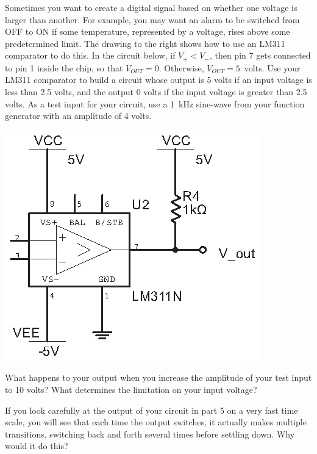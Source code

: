 \begin{enumerate}[wide]
\vspace{0.2in}
\begin{minipage}{.58\textwidth} %

\item Sometimes you want to create a digital signal based on whether one voltage is larger than another.  For example, you may want an alarm to be switched from OFF to ON if some temperature, represented by a voltage, rises above some predetermined limit. The drawing to the right shows how to use an LM311 comparator to do this.  In the circuit below, if $V_+<V_-$, then pin 7 gets connected to pin 1 inside the chip, so that $V_{OUT}=0$.  Otherwise, $V_{OUT}=5$~volts.  Use your LM311 comparator to build a circuit whose output is 5 volts if an input voltage is less than 2.5 volts, and the output 0 volts if the input voltage is greater than 2.5 volts.  As a test input for your circuit, use a 1~kHz sine-wave from your function generator with an amplitude of 4 volts.
\end{minipage}
\begin{minipage}{.39\textwidth}

\hspace{0.25in}\includegraphics{digital_electronics/basic_lm311.eps}
\end{minipage}

\pagebreak

\item What happens to your output when you increase the amplitude of your test input to 10 volts?  What determines the limitation on your input voltage?

\item If you look carefully at the output of your circuit in part 5 on a very fast time scale, you will see that each time the output switches, it actually makes multiple transitions, switching back and forth several times before settling down.  Why would it do this?  


\end{enumerate}
